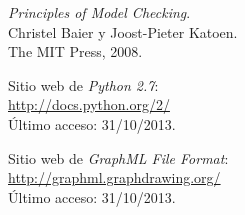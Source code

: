  \emph{Principles of Model Checking}.\\
 Christel Baier y Joost-Pieter Katoen.\\
 The MIT Press, 2008.




%
%

 Sitio web de \emph{Python 2.7}:\\
 \url{http://docs.python.org/2/}\\
 Último acceso: 31/10/2013.

 Sitio web de \emph{GraphML File Format}:\\
 \url{http://graphml.graphdrawing.org/}\\
 Último acceso: 31/10/2013.
